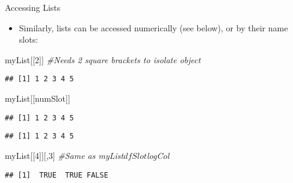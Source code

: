 \documentclass[
  ignorenonframetext,
  aspectratio=169]{beamer}
\newenvironment{Shaded}{\begin{snugshade}}{\end{snugshade}}
\newcommand{\CommentTok}[1]{\textcolor[rgb]{0.56,0.35,0.01}{\textit{#1}}}
\newcommand{\DecValTok}[1]{\textcolor[rgb]{0.00,0.00,0.81}{#1}}
\newcommand{\NormalTok}[1]{#1}
\newcommand{\SpecialCharTok}[1]{\textcolor[rgb]{0.81,0.36,0.00}{\textbf{#1}}}
\newcommand{\StringTok}[1]{\textcolor[rgb]{0.31,0.60,0.02}{#1}}
\providecommand{\tightlist}{%
  \setlength{\itemsep}{0pt}\setlength{\parskip}{0pt}}
\begin{document}
\begin{frame}[fragile]{Accessing Lists}
\protect\hypertarget{accessing-lists}{}
\begin{itemize}[<+->]
\tightlist
\item
  Similarly, lists can be accessed numerically (see below), or by their
  name slots:
\end{itemize}

\footnotesize

\begin{Shaded}
\begin{Highlighting}[]
\NormalTok{myList[[}\DecValTok{2}\NormalTok{]] }\CommentTok{\#Needs 2 square brackets to isolate object}
\end{Highlighting}
\end{Shaded}

\begin{verbatim}
## [1] 1 2 3 4 5
\end{verbatim}

\begin{Shaded}
\begin{Highlighting}[]
\NormalTok{myList[[}\StringTok{\textquotesingle{}numSlot\textquotesingle{}}\NormalTok{]]}
\end{Highlighting}
\end{Shaded}

\begin{verbatim}
## [1] 1 2 3 4 5
\end{verbatim}

\begin{Shaded}
\end{Shaded}

\begin{verbatim}
## [1] 1 2 3 4 5
\end{verbatim}

\begin{Shaded}
\begin{Highlighting}[]
\NormalTok{myList[[}\DecValTok{4}\NormalTok{]][,}\DecValTok{3}\NormalTok{] }\CommentTok{\#Same as myList$dfSlot$logCol}
\end{Highlighting}
\end{Shaded}

\begin{verbatim}
## [1]  TRUE  TRUE FALSE
\end{verbatim}

\normalsize
\end{frame}
\end{document}
